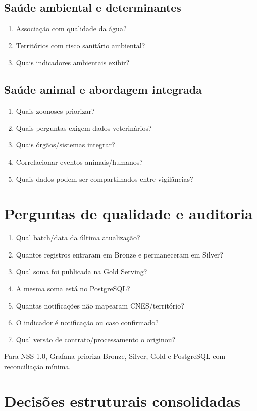 \documentclass[12pt,a4paper]{article}
\begin{document}
\subsection{Saúde ambiental e determinantes}
\begin{enumerate}[label=\textbf{A\arabic*.},leftmargin=*]\item Associação com qualidade da água?\item Territórios com risco sanitário ambiental?\item Quais indicadores ambientais exibir?\end{enumerate}
\subsection{Saúde animal e abordagem integrada}
\begin{enumerate}[label=\textbf{Z\arabic*.},leftmargin=*]\item Quais zoonoses priorizar?\item Quais perguntas exigem dados veterinários?\item Quais órgãos/sistemas integrar?\item Correlacionar eventos animais/humanos?\item Quais dados podem ser compartilhados entre vigilâncias?\end{enumerate}
\section{Perguntas de qualidade e auditoria}
\begin{enumerate}[label=\textbf{Q\arabic*.},leftmargin=*]\item Qual batch/data da última atualização?\item Quantos registros entraram em Bronze e permaneceram em Silver?\item Qual soma foi publicada na Gold Serving?\item A mesma soma está no PostgreSQL?\item Quantas notificações não mapearam CNES/território?\item O indicador é notificação ou caso confirmado?\item Qual versão de contrato/processamento o originou?\end{enumerate}
Para NSS 1.0, Grafana prioriza Bronze, Silver, Gold e PostgreSQL com reconciliação mínima.
\section{Decisões estruturais consolidadas}
\end{document}
